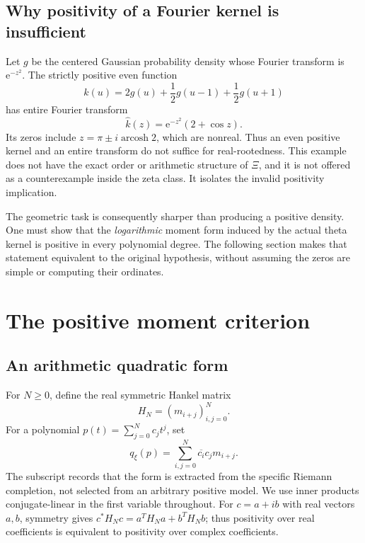 \documentclass[11pt,letterpaper]{article}
\numberwithin{equation}{section}
\theoremstyle{definition}
\theoremstyle{remark}
\newcommand{\e}{\mathrm e}
\DeclareMathOperator{\arcosh}{arcosh}
\begin{document}
\subsection{Why positivity of a Fourier kernel is insufficient}
Let $g$ be the centered Gaussian probability density whose Fourier transform is $\e^{-z^2}$. The strictly positive even function
\begin{equation}
 k(u)=2g(u)+\frac12g(u-1)+\frac12g(u+1)
\end{equation}
has entire Fourier transform
\begin{equation}
 \widehat k(z)=\e^{-z^2}(2+\cos z).
\end{equation}
Its zeros include $z=\pi\pm i\arcosh 2$, which are nonreal. Thus an even positive kernel and an entire transform do not suffice for real-rootedness. This example does not have the exact order or arithmetic structure of $\Xi$, and it is not offered as a counterexample inside the zeta class. It isolates the invalid positivity implication.

The geometric task is consequently sharper than producing a positive density. One must show that the \emph{logarithmic} moment form induced by the actual theta kernel is positive in every polynomial degree. The following section makes that statement equivalent to the original hypothesis, without assuming the zeros are simple or computing their ordinates.

\section{The positive moment criterion}
\label{sec:moments}
\subsection{An arithmetic quadratic form}
For $N\geq0$, define the real symmetric Hankel matrix
\begin{equation}
 H_N=(m_{i+j})_{i,j=0}^{N}.
 \label{eq:hankel}
\end{equation}
For a polynomial $p(t)=\sum_{j=0}^{N}c_jt^j$, set
\begin{equation}
 q_\xi(p)=\sum_{i,j=0}^{N}\overline{c_i}c_jm_{i+j}.
 \label{eq:qxi}
\end{equation}
The subscript records that the form is extracted from the specific Riemann completion, not selected from an arbitrary positive model. We use inner products conjugate-linear in the first variable throughout. For $c=a+ib$ with real vectors $a,b$, symmetry gives $c^*H_Nc=a^TH_Na+b^TH_Nb$; thus positivity over real coefficients is equivalent to positivity over complex coefficients.
\end{document}
